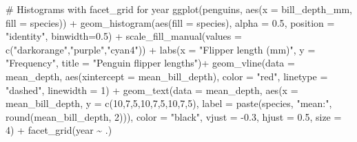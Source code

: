 \documentclass[
  letterpaper,
  DIV=11,
  numbers=noendperiod]{scrreprt}
\newenvironment{Shaded}{\begin{snugshade}}{\end{snugshade}}
\newcommand{\AttributeTok}[1]{\textcolor[rgb]{0.40,0.45,0.13}{#1}}
\newcommand{\CommentTok}[1]{\textcolor[rgb]{0.37,0.37,0.37}{#1}}
\newcommand{\DecValTok}[1]{\textcolor[rgb]{0.68,0.00,0.00}{#1}}
\newcommand{\FloatTok}[1]{\textcolor[rgb]{0.68,0.00,0.00}{#1}}
\newcommand{\FunctionTok}[1]{\textcolor[rgb]{0.28,0.35,0.67}{#1}}
\newcommand{\NormalTok}[1]{\textcolor[rgb]{0.00,0.23,0.31}{#1}}
\newcommand{\SpecialCharTok}[1]{\textcolor[rgb]{0.37,0.37,0.37}{#1}}
\newcommand{\StringTok}[1]{\textcolor[rgb]{0.13,0.47,0.30}{#1}}
\begin{document}
\begin{Shaded}
\begin{Highlighting}[]
\CommentTok{\# Histograms with facet\_grid for year}
\FunctionTok{ggplot}\NormalTok{(penguins, }\FunctionTok{aes}\NormalTok{(}\AttributeTok{x =}\NormalTok{ bill\_depth\_mm, }\AttributeTok{fill =}\NormalTok{ species)) }\SpecialCharTok{+}
  \FunctionTok{geom\_histogram}\NormalTok{(}\FunctionTok{aes}\NormalTok{(}\AttributeTok{fill =}\NormalTok{ species), }
     \AttributeTok{alpha =} \FloatTok{0.5}\NormalTok{, }
     \AttributeTok{position =} \StringTok{"identity"}\NormalTok{,}
     \AttributeTok{binwidth=}\FloatTok{0.5}\NormalTok{) }\SpecialCharTok{+}
  \FunctionTok{scale\_fill\_manual}\NormalTok{(}\AttributeTok{values =} \FunctionTok{c}\NormalTok{(}\StringTok{"darkorange"}\NormalTok{,}\StringTok{"purple"}\NormalTok{,}\StringTok{"cyan4"}\NormalTok{)) }\SpecialCharTok{+}
  \FunctionTok{labs}\NormalTok{(}\AttributeTok{x =} \StringTok{"Flipper length (mm)"}\NormalTok{,}
     \AttributeTok{y =} \StringTok{"Frequency"}\NormalTok{,}
     \AttributeTok{title =} \StringTok{"Penguin flipper lengths"}\NormalTok{)}\SpecialCharTok{+}
  \FunctionTok{geom\_vline}\NormalTok{(}\AttributeTok{data =}\NormalTok{ mean\_depth, }\FunctionTok{aes}\NormalTok{(}\AttributeTok{xintercept =}\NormalTok{ mean\_bill\_depth),}
     \AttributeTok{color =} \StringTok{"red"}\NormalTok{, }\AttributeTok{linetype =} \StringTok{"dashed"}\NormalTok{, }\AttributeTok{linewidth =} \DecValTok{1}\NormalTok{) }\SpecialCharTok{+}
  \FunctionTok{geom\_text}\NormalTok{(}\AttributeTok{data =}\NormalTok{ mean\_depth, }\FunctionTok{aes}\NormalTok{(}\AttributeTok{x =}\NormalTok{ mean\_bill\_depth, }\AttributeTok{y =} \FunctionTok{c}\NormalTok{(}\DecValTok{10}\NormalTok{,}\DecValTok{7}\NormalTok{,}\DecValTok{5}\NormalTok{,}\DecValTok{10}\NormalTok{,}\DecValTok{7}\NormalTok{,}\DecValTok{5}\NormalTok{,}\DecValTok{10}\NormalTok{,}\DecValTok{7}\NormalTok{,}\DecValTok{5}\NormalTok{),}
     \AttributeTok{label =} \FunctionTok{paste}\NormalTok{(species, }\StringTok{"mean:"}\NormalTok{, }\FunctionTok{round}\NormalTok{(mean\_bill\_depth, }\DecValTok{2}\NormalTok{))),}
     \AttributeTok{color =} \StringTok{"black"}\NormalTok{, }\AttributeTok{vjust =} \SpecialCharTok{{-}}\FloatTok{0.3}\NormalTok{, }\AttributeTok{hjust =} \FloatTok{0.5}\NormalTok{, }\AttributeTok{size =} \DecValTok{4}\NormalTok{) }\SpecialCharTok{+}
  \FunctionTok{facet\_grid}\NormalTok{(year }\SpecialCharTok{\textasciitilde{}}\NormalTok{ .) }
\end{Highlighting}
\end{Shaded}
\end{document}
